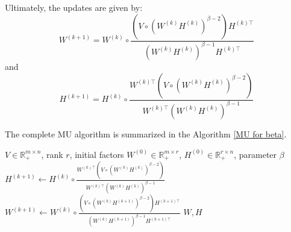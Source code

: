 Ultimately, the updates are given by:
\begin{equation}
    \boxed{W^{(k+1)} = W^{(k)} \circ \frac{(V \circ (W^{(k)}H^{(k)})^{\beta - 2}) H^{(k) \top}}{(W^{(k)}H^{(k)})^{\beta - 1} H^{(k) \top}}}
\end{equation}
and
\begin{equation}
    \boxed{H^{(k+1)} = H^{(k)} \circ \frac{W^{(k) \top} (V \circ (W^{(k)} H^{(k)})^{\beta - 2})}{W^{(k) \top} (W^{(k)} H^{(k)})^{\beta - 1}}}
\end{equation}
\par
The complete MU algorithm is summarized in the Algorithm \ref{MU for beta}.
\begin{algorithm}
    \caption{Multiplicative Updates for NMF with the beta divergence}
    \label{MU for beta}
    \begin{algorithmic}[1]
        \Require \( V \in \mathbb{R}_+^{m \times n} \), rank \( r \), initial factors \( W^{(0)} \in \mathbb{R}_+^{m \times r} \), \( H^{(0)} \in \mathbb{R}_+^{r \times n} \), parameter \( \beta \)
            \State \( H^{(k+1)} \leftarrow H^{(k)} \circ \frac{W^{(k) \top} (V \circ (W^{(k)} H^{(k)})^{\beta - 2})}{W^{(k) \top} (W^{(k)} H^{(k)})^{\beta - 1}} \)
            \State \( W^{(k+1)} \leftarrow W^{(k)} \circ \frac{(V \circ (W^{(k)}H^{(k+1)})^{\beta - 2}) H^{(k+1) \top}}{(W^{(k)}H^{(k+1)})^{\beta - 1} H^{(k+1) \top}} \)
        \EndWhile
        \State \Return \( W, H \)
    \end{algorithmic}
\end{algorithm}
